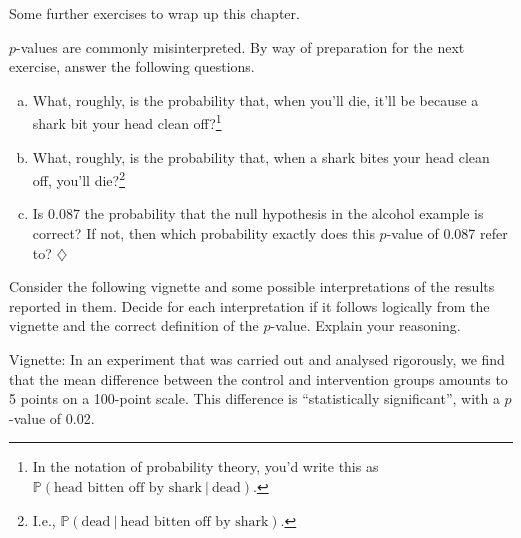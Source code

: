 \documentclass[a4paper]{tufte-book}\usepackage[]{graphicx}\usepackage[]{xcolor}
\newcommand*{\parend}[1][$\diamondsuit$]{%
\leavevmode\unskip\penalty9999 \hbox{}\nobreak\hfill
    \quad\hbox{#1}%
}
\begin{document}
\medskip

Some further exercises to wrap up this chapter.

\medskip

$p$-values are commonly misinterpreted.
By way of preparation for the next exercise, answer the following questions.

\begin{enumerate}[(a)]
  \item What, roughly, is the probability that, when you'll die, it'll be because a shark bit your head clean off?\footnote{In the notation of probability theory, you'd write this as $\mathbb{P}(\textrm{head bitten off by shark}~|~\textrm{dead}).$}
  \item What, roughly, is the probability that, when a shark bites your head clean off, you'll die?\footnote{I.e., $\mathbb{P}(\textrm{dead}~|~\textrm{head bitten off by shark})$.}
  \item Is 0.087 the probability that the null hypothesis in the alcohol example is correct?
  If not, then which probability exactly does this $p$-value of 0.087 refer to? \parend
\end{enumerate}

Consider the following vignette and some possible interpretations of the results reported in them. Decide for each interpretation if it follows logically from the vignette and the correct definition of the $p$-value. Explain your reasoning.

Vignette: In an experiment that was carried out and analysed rigorously, we find that the mean difference between the control and intervention groups amounts to 5 points on a 100-point scale. This difference is ``statistically significant'', with a $p$-value of 0.02.
\end{document}
